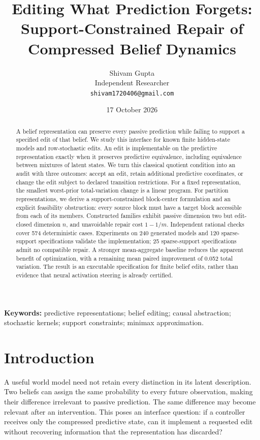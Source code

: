 \documentclass[11pt,letterpaper]{article}
\title{\vspace{-1.8em}\textbf{Editing What Prediction Forgets:}\\Support-Constrained Repair of\\Compressed Belief Dynamics}
\author{Shivam Gupta\\Independent Researcher\\\texttt{shivam1720406@gmail.com}}
\date{17 October 2026}
\begin{document}
\maketitle
\begin{abstract}
A belief representation can preserve every passive prediction while failing to support a specified edit of that belief. We study this interface for known finite hidden-state models and row-stochastic edits. An edit is implementable on the predictive representation exactly when it preserves predictive equivalence, including equivalence between mixtures of latent states. We turn this classical quotient condition into an audit with three outcomes: accept an edit, retain additional predictive coordinates, or change the edit subject to declared transition restrictions. For a fixed representation, the smallest worst-prior total-variation change is a linear program. For partition representations, we derive a support-constrained block-center formulation and an explicit feasibility obstruction: every source block must have a target block accessible from each of its members. Constructed families exhibit passive dimension two but edit-closed dimension $n$, and unavoidable repair cost $1-1/m$. Independent rational checks cover 574 deterministic cases. Experiments on 240 generated models and 120 sparse-support specifications validate the implementation; 25 sparse-support specifications admit no compatible repair. A stronger mean-aggregate baseline reduces the apparent benefit of optimization, with a remaining mean paired improvement of 0.052 total variation. The result is an executable specification for finite belief edits, rather than evidence that neural activation steering is already certified.
\end{abstract}
\noindent\textbf{Keywords:} predictive representations; belief editing; causal abstraction; stochastic kernels; support constraints; minimax approximation.

\section{Introduction}
A useful world model need not retain every distinction in its latent description. Two beliefs can assign the same probability to every future observation, making their difference irrelevant to passive prediction. The same difference may become relevant after an intervention. This poses an interface question: if a controller receives only the compressed predictive state, can it implement a requested edit without recovering information that the representation has discarded?
\end{document}

